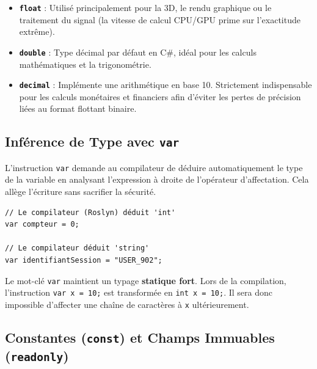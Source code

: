 \begin{tcolorbox}[colback=white,colframe=keywordcolor,title=\textbf{Critères de choix : float, double et decimal}]
    \begin{itemize}
        \item \textbf{\texttt{float}} : Utilisé principalement pour la 3D, le rendu graphique ou le traitement du signal (la vitesse de calcul CPU/GPU prime sur l'exactitude extrême).
        \item \textbf{\texttt{double}} : Type décimal par défaut en C\#, idéal pour les calculs mathématiques et la trigonométrie.
        \item \textbf{\texttt{decimal}} : Implémente une arithmétique en base 10. Strictement indispensable pour les calculs monétaires et financiers afin d'éviter les pertes de précision liées au format flottant binaire.
    \end{itemize}
\end{tcolorbox}

\subsection{Inférence de Type avec \texttt{var}}

L'instruction \texttt{var} demande au compilateur de déduire automatiquement le type de la variable en analysant l'expression à droite de l'opérateur d'affectation. Cela allège l'écriture sans sacrifier la sécurité.

\begin{lstlisting}[caption={Typage statique implicite avec var}]
// Le compilateur (Roslyn) déduit 'int'
var compteur = 0; 

// Le compilateur déduit 'string'
var identifiantSession = "USER_902"; 
\end{lstlisting}

\begin{tcolorbox}[colback=backcolour,colframe=stringcolor,title=\textbf{Avertissement Architectural : \texttt{var} n'est pas dynamique}]
    Le mot-clé \texttt{var} maintient un typage \textbf{statique fort}. Lors de la compilation, l'instruction \texttt{var x = 10;} est transformée en \texttt{int x = 10;}. Il sera donc impossible d'affecter une chaîne de caractères à \texttt{x} ultérieurement.
\end{tcolorbox}

\subsection{Constantes (\texttt{const}) et Champs Immuables (\texttt{readonly})}

